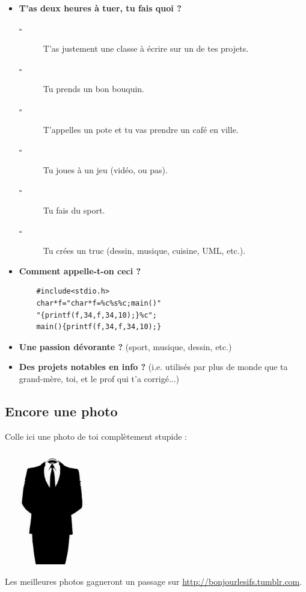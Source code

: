 \begin{itemize}
    \item \textbf{T'as deux heures à tuer, tu fais quoi ?}
    \begin{description}
	\item[$\square$] T'as justement une classe à écrire sur un de tes projets.
	\item[$\square$] Tu prends un bon bouquin.
	\item[$\square$] T'appelles un pote et tu vas prendre un café en ville.
	\item[$\square$] Tu joues à un jeu (vidéo, ou pas).
	\item[$\square$] Tu fais du sport.
	\item[$\square$] Tu crées un truc (dessin, musique, cuisine, UML, etc.).
    \end{description}
	\vspace{2em}
	
    \item \textbf{Comment appelle-t-on ceci ?}
    \begin{verbatim}
	#include<stdio.h>
	char*f="char*f=%c%s%c;main()"
	"{printf(f,34,f,34,10);}%c";
	main(){printf(f,34,f,34,10);}
    \end{verbatim}
    \vspace{8cm}
	
    \item \textbf{Une passion dévorante ?} (sport, musique, dessin, etc.)
    \vspace{4cm}
	
    \item \textbf{Des projets notables en info ?} (i.e. utilisés par plus de monde que ta grand-mère, toi, et le prof qui t'a corrigé...)
    \vspace{4cm}

\end{itemize}

\subsection*{Encore une photo}
Colle ici une photo de toi complètement stupide :
\begin{center}
\includegraphics[height=5cm, angle=120]{images/anonymous.jpg}
\end{center}
Les meilleures photos gagneront un passage sur
\url{http://bonjourlesifs.tumblr.com}.


